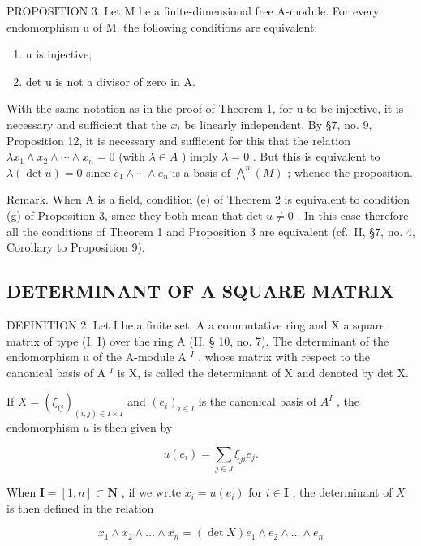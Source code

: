 PROPOSITION 3. Let M be a finite-dimensional free A-module. For every endomorphism u of M, the following conditions are equivalent:

\begin{enumerate}
\def\labelenumi{(\alph{enumi})}
\setcounter{enumi}{5}
\item
  u is injective;
\item
  det u is not a divisor of zero in A.
\end{enumerate}

With the same notation as in the proof of Theorem 1, for u to be injective, it is necessary and sufficient that the \(x_{i}\) be linearly independent. By §7, no. 9, Proposition 12, it is necessary and sufficient for this that the relation \(\lambda x_{1} \wedge x_{2} \wedge \cdots \wedge x_{n} = 0\) (with \(\lambda \in A\) ) imply \(\lambda = 0\) . But this is equivalent to \(\lambda(\det u) = 0\) since \(e_{1} \wedge \cdots \wedge e_{n}\) is a basis of \(\bigwedge^{n}(M)\) ; whence the proposition.

Remark. When A is a field, condition (e) of Theorem 2 is equivalent to condition (g) of Proposition 3, since they both mean that det \(u \neq 0\) . In this case therefore all the conditions of Theorem 1 and Proposition 3 are equivalent (cf.~II, §7, no. 4, Corollary to Proposition 9).

\subsection{DETERMINANT OF A SQUARE MATRIX}

DEFINITION 2. Let I be a finite set, A a commutative ring and X a square matrix of type (I, I) over the ring A (II, § 10, no. 7). The determinant of the endomorphism u of the A-module A \(^{I}\) , whose matrix with respect to the canonical basis of A \(^{I}\) is X, is called the determinant of X and denoted by det X.

If \(X = (\xi_{ij})_{(i,j) \in I \times I}\) and \((e_i)_{i \in I}\) is the canonical basis of \(A^I\) , the endomorphism \(u\) is then given by

\[
u (e _ {i}) = \sum_ {j \in J} \xi_ {j i} e _ {j}.
\]

When \(\mathbf{I} = [1, n] \subset \mathbf{N}\) , if we write \(x_{i} = u(e_{i})\) for \(i \in \mathbf{I}\) , the determinant of \(X\) is then defined in the relation

\[
x _ {1} \wedge x _ {2} \wedge \dots \wedge x _ {n} = (\det X) e _ {1} \wedge e _ {2} \wedge \dots \wedge e _ {n}\tag{6}
\]

